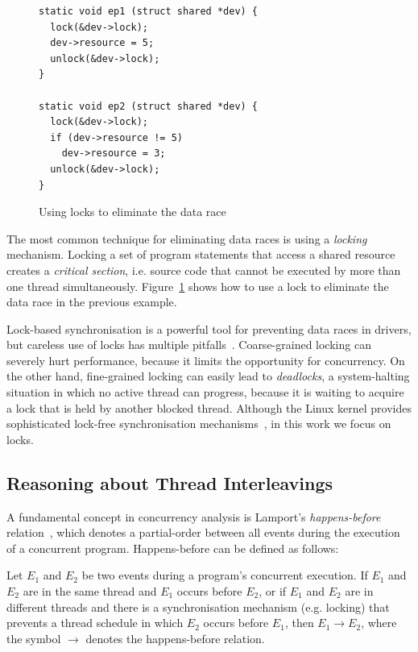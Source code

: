\begin{figure}[!h]
\centering
\noindent\begin{minipage}{.95\textwidth}
\begin{lstlisting}
static void ep1 (struct shared *dev) {
  lock(&dev->lock);
  dev->resource = 5;
  unlock(&dev->lock);
}

static void ep2 (struct shared *dev) {
  lock(&dev->lock);
  if (dev->resource != 5)
    dev->resource = 3;
  unlock(&dev->lock);
}
\end{lstlisting}
\end{minipage}
\caption{Using locks to eliminate the data race}
\label{fig:lock_example}
\end{figure}

The most common technique for eliminating data races is using a \emph{locking} mechanism. Locking a set of program statements that access a shared resource creates a \emph{critical section}, i.e. source code that cannot be executed by more than one thread simultaneously. Figure~\ref{fig:lock_example} shows how to use a lock to eliminate the data race in the previous example.

Lock-based synchronisation is a powerful tool for preventing data races in drivers, but careless use of locks has multiple pitfalls~\cite{sutter2005software}. Coarse-grained locking can severely hurt performance, because it limits the opportunity for concurrency. On the other hand, fine-grained locking can easily lead to \emph{deadlocks}, a system-halting situation in which no active thread can progress, because it is waiting to acquire a lock that is held by another blocked thread. Although the Linux kernel provides sophisticated lock-free synchronisation mechanisms~\cite{corbet2005linux}, in this work we focus on locks.

\subsection{Reasoning about Thread Interleavings}
\label{bg:happensbefore}

A fundamental concept in concurrency analysis is Lamport's \emph{happens-before} relation~\cite{lamport1978time}, which denotes a partial-order between all events during the execution of a concurrent program. Happens-before can be defined as follows:

\begin{definition}
\label{definition:datarace}
Let $E_1$ and $E_2$ be two events during a program's concurrent execution. If $E_1$ and $E_2$ are in the same thread and $E_1$ occurs before $E_2$, or if $E_1$ and $E_2$ are in different threads and there is a synchronisation mechanism (e.g. locking) that prevents a thread schedule in which $E_2$ occurs before $E_1$, then $E_1 \rightarrow E_2$, where the symbol $\rightarrow$ denotes the happens-before relation.
\end{definition}

